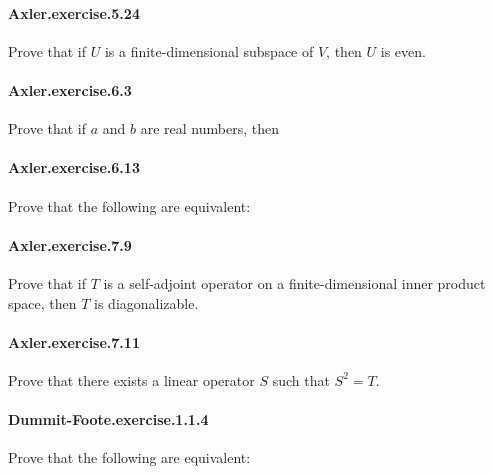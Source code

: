 \documentclass{article}
\begin{document}
\paragraph{Axler.exercise.5.24} Prove that if $U$ is a finite-dimensional subspace of $V$, then $U$ is even.

\paragraph{Axler.exercise.6.3} Prove that if $a$ and $b$ are real numbers, then

\paragraph{Axler.exercise.6.13} Prove that the following are equivalent:


\paragraph{Axler.exercise.7.9} Prove that if $T$ is a self-adjoint operator on a finite-dimensional inner product space, then $T$ is diagonalizable.

\paragraph{Axler.exercise.7.11} Prove that there exists a linear operator $S$ such that $S^2 = T$.


\paragraph{Dummit-Foote.exercise.1.1.4} Prove that the following are equivalent:

\end{document}
